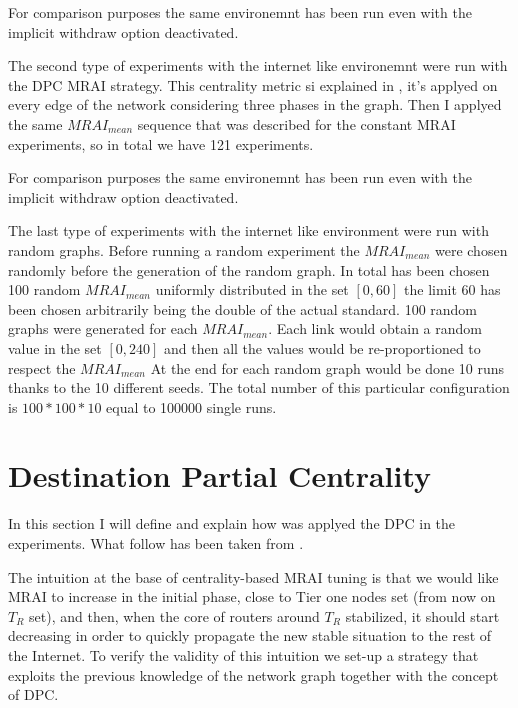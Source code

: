 \documentclass[10pt,conference,letterpaper]{IEEEtran}
\newcommand{\tr}{\ensuremath{T_{R}}\xspace}
\begin{document}
For comparison purposes the same environemnt has been run even with the 
implicit withdraw option deactivated.

The second type of experiments with the internet like environemnt were run
with the \ac{DPC} \ac{MRAI} strategy.
This centrality metric si explained in , it's applyed on every
edge of the network considering three phases in the graph.
Then I applyed the same $MRAI_{mean}$ sequence that was described for the
constant \ac{MRAI} experiments, so in total we have \num{121} experiments.

For comparison purposes the same environemnt has been run even with the 
implicit withdraw option deactivated.

The last type of experiments with the internet like environment were run 
with random graphs.
Before running a random experiment the $MRAI_{mean}$ were chosen randomly before
the generation of the random graph.
In total has been chosen \num{100} random $MRAI_{mean}$ uniformly distributed
in the set $[0, 60]$ the limit \num{60} has been chosen arbitrarily being the
double of the actual standard.
\num{100} random graphs were generated for each $MRAI_{mean}$.
Each link would obtain a random value in the set $[0, 240]$ and then all the
values would be re-proportioned to respect the $MRAI_{mean}$
At the end for each random graph would be done \num{10} runs thanks to the 10 
different seeds.
The total number of this particular configuration is $100*100*10$ equal to 
\num{100000} single runs.

\section{Destination Partial Centrality}
\label{sec:dpc}

In this section I will define and explain how was applyed the \ac{DPC} in the
experiments.
What follow has been taken from \cite{milani2020improving}.

The intuition at the base of centrality-based \ac{MRAI} tuning is that we would 
like \ac{MRAI} to increase in the initial phase, close to Tier one nodes set (from now on \tr set),
and then, when the core of routers around \tr stabilized, it should start decreasing in 
order to quickly propagate the new stable situation to the rest of the Internet. 
To verify the validity of this intuition we set-up a strategy that exploits  
the previous knowledge of the network graph together with the concept of \acf{DPC}.
\end{document}
